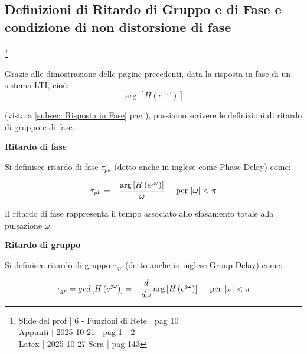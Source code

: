 \newpage 

\subsection{Definizioni di Ritardo di Gruppo e di Fase e condizione di non distorsione di fase}

\footnote{ 
    Slide del prof | 6 - Funzioni di Rete | pag 10\\
    Appunti | 2025-10-21 | pag 1 - 2  \\
    Latex | 2025-10-27 Sera | pag 143
}

Grazie alle dimostrazione delle pagine precedenti, data la risposta in fase di un sistema LTI, 
cioè: 
{
    \Large 
    \begin{equation}
        \arg \left[ H \left( e^{\jmath \omega}\right)\right]
    \end{equation}
}

(vista a \ref{subsec: Risposta in Fase}  pag \pageref{subsec: Risposta in Fase}), 
possiamo scrivere le definizioni di ritardo di gruppo e di fase. \newline 

\textbf{Ritardo di fase} \newline 

Si definisce ritardo di fase $\tau_{ph}$ (detto anche in inglese come Phase Delay) come: 

{
    \Large 
    \begin{equation}
        \tau_{ph} 
        = 
        - 
        \dfrac{\arg \left[ H \left( e^{\jmath \omega}\right)\right]}{\omega} 
        \quad
        \text{ per }
        \abs{\omega} < \pi
    \end{equation}
}

Il ritardo di fase rappresenta il tempo associato allo sfasamento totale alla pulsazione $\omega$. \newline 

\textbf{Ritardo di gruppo} \newline 

Si definisce ritardo di gruppo $\tau_{gr}$ (detto anche in inglese Group Delay) come:

{
    \Large 
    \begin{equation}
        \tau_{gr} 
        = 
        grd \left[ H \left( e^{\jmath \omega}\right)\right]
        = 
        - \dfrac{d}{d \omega} \arg \left[ H \left( e^{\jmath \omega}\right)\right] 
        \quad
        \text{ per }
        \abs{\omega} < \pi
    \end{equation}
}

